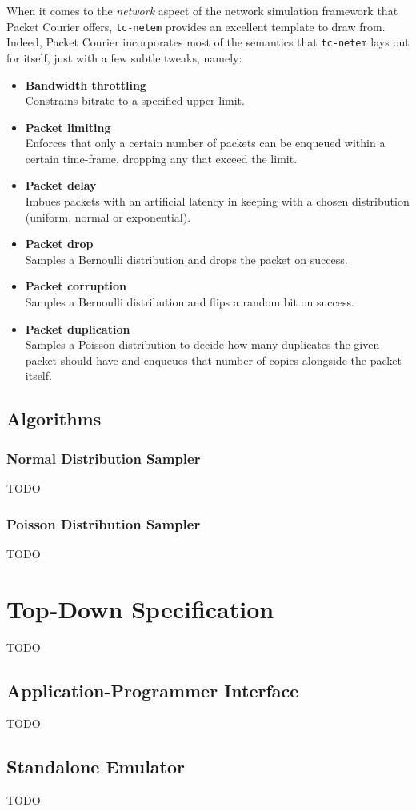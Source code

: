 When it comes to the \emph{network} aspect of the network simulation framework that Packet Courier offers,
\texttt{tc-netem}\cite{tc_netem_wiki, tc_netem_8_man,tc_netem_src} provides an excellent template to draw from.
Indeed, Packet Courier incorporates most of the semantics that \texttt{tc-netem} lays out for itself, just with a few
subtle tweaks, namely:
\begin{itemize}
    \item \textbf{Bandwidth throttling} \\
    Constrains bitrate to a specified upper limit.
    \item \textbf{Packet limiting} \\
    Enforces that only a certain number of packets can be enqueued within a certain time-frame, dropping any that
    exceed the limit.
    \item \textbf{Packet delay} \\
    Imbues packets with an artificial latency in keeping with a chosen distribution (uniform, normal or exponential).
    \item \textbf{Packet drop} \\
    Samples a Bernoulli distribution and drops the packet on success.
    \item \textbf{Packet corruption} \\
    Samples a Bernoulli distribution and flips a random bit on success.
    \item \textbf{Packet duplication} \\
    Samples a Poisson distribution to decide how many duplicates the given packet should have and enqueues that
    number of copies alongside the packet itself.
\end{itemize}

\subsection{Algorithms}

\subsubsection{Normal Distribution Sampler}

TODO

\subsubsection{Poisson Distribution Sampler}

TODO


\section{Top-Down Specification}

TODO

\subsection{Application-Programmer Interface}

TODO

\subsection{Standalone Emulator}

TODO
